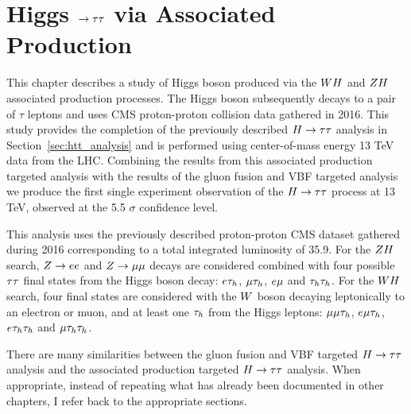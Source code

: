 \chapter{Higgs $\to \tau\tau$ via Associated Production}
\label{sec:vh_analysis}

This chapter describes a study of Higgs boson produced via the $WH$ and
$ZH$ associated production processes. The Higgs boson subsequently
decays to a pair of $\tau$ leptons and uses CMS proton-proton collision data gathered in 2016. 
This study provides the completion of the previously described
$H\to\tau\tau$ analysis in Section~\ref{sec:htt_analysis} and is performed 
using center-of-mass energy 13 TeV data from the LHC. Combining
the results from this associated production targeted analysis with the results 
of the gluon fusion and VBF targeted analysis
we produce the first single experiment observation of the $H\to\tau\tau$ process at 13 TeV, 
observed at the 5.5 $\sigma$ confidence level. 

This analysis uses the previously described proton-proton CMS dataset gathered during 2016 
corresponding to a total integrated luminosity of 35.9\fbinv.
For the $ZH$ search, $Z\rightarrow ee$
and $Z \to \mu\mu$ decays are considered combined with four possible $\tau\tau$ 
final states from the Higgs boson decay: $e\tau_{h}$, $\mu\tau_{h}$,
$e\mu$ and $\tau_{h}\tau_{h}$. For the $WH$ search, four final states are considered with
the $W$ boson decaying leptonically to an electron or muon, and at least one $\tau_{h}$ from the Higgs leptons:
$\mu\mu\tau_{h}$, $e\mu\tau_{h}$, $e\tau_{h}\tau_{h}$ and $\mu\tau_{h}\tau_{h}$. 

There are many similarities between the gluon fusion and VBF targeted $H\to\tau\tau$ analysis
and the associated production targeted $H\to\tau\tau$ analysis. When appropriate, instead of repeating
what has already been documented in other chapters, I refer back to the appropriate sections.



